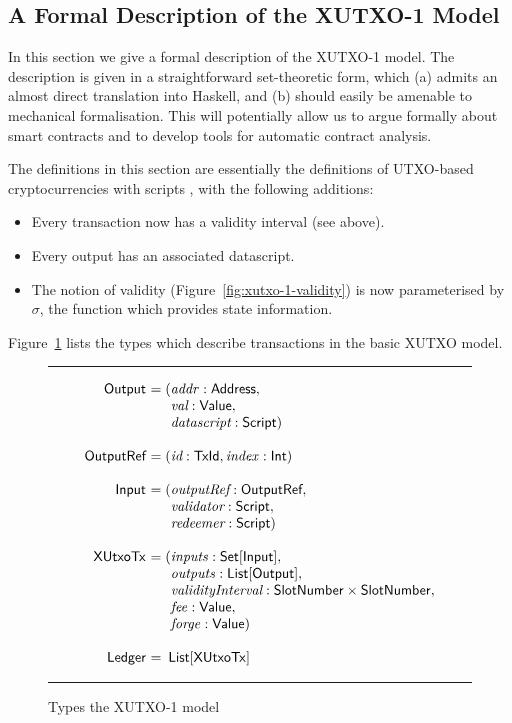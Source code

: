 \documentclass[a4paper]{article}
\renewcommand{\i}{\textit}  %
\newcommand{\s}{\textsf}  %
\theoremstyle{definition}  %
\newenvironment{arraydefs}[1]{\setlength{\arraycolsep}{0pt}\begin{array}{#1}}{\end{array}}
\newcommand\rfskip{7pt}
\newenvironment{ruledfigure}[1]{\begin{figure}[#1]\hrule\vspace{\rfskip}}{\vspace{\rfskip}\hrule\end{figure}}
\newcommand{\List}[1]{\ensuremath{\s{List}[#1]}}
\newcommand{\Set}[1]{\ensuremath{\s{Set}[#1]}}
\newcommand{\mi}[1]{\ensuremath{\mathit{#1}}}
\newcommand{\idx}{\mi{index}}
\newcommand{\inputs}{\mi{inputs}}
\newcommand{\outputs}{\mi{outputs}}
\newcommand{\forge}{\mi{forge}}
\newcommand{\fee}{\mi{fee}}
\newcommand{\addr}{\mi{addr}}
\newcommand{\msf}[1]{\ensuremath{\mathsf{#1}}}
\newcommand{\slotnum}{\msf{SlotNumber}}
\newcommand{\xutxotx}{\msf{XUtxoTx}}
\newcommand{\valuetype}{\ensuremath{\s{Value}}}
\begin{document}
\subsection{A Formal Description of the XUTXO-1 Model}
\label{section:xutxo-spec}

In this section we give a formal description of the XUTXO-1 model.  The
description is given in a straightforward set-theoretic form, which
(a) admits an almost direct translation into Haskell, and (b) should
easily be amenable to mechanical formalisation.  This will potentially
allow us to argue formally about smart contracts and to develop tools
for automatic contract analysis.

The definitions in this section are essentially the definitions of
UTXO-based cryptocurrencies with scripts \cite{Zahnentferner18-UTxO},
with the following additions:
\begin{itemize}
\item Every transaction now has a validity interval (see above).
\item Every output has an associated datascript.
\item The notion of validity (Figure~\ref{fig:xutxo-1-validity}) is now
  parameterised by $\sigma$, the function which provides state
  information.
\end{itemize}

\noindent Figure~\ref{fig:xutxo-1-types} lists the types which
describe transactions in the basic XUTXO model.


\begin{ruledfigure}{H}
  \[
  \begin{arraydefs}{rll}
    
    \s{Output } &= (&\addr: \s{Address},\\
    && \i{val}: \valuetype,\\
    &&  \i{datascript}: \s{Script})\\
    \\
    \s{OutputRef } &= (&\i{id}: \s{TxId}, \idx: \s{Int})\\
    \\
    \s{Input } & = (&\i{outputRef}: \s{OutputRef},\\
                 && \i{validator}: \s{Script},\\
                 && \i{redeemer}: \s{Script})\\
     \\
     \xutxotx\s{ } &= (&\inputs: \Set{\s{Input}},\\
     &&\outputs: \List{\s{Output}},\\
     &&\i{validityInterval}: \slotnum \times \slotnum,\\
     && \fee: \valuetype,\\
     &&\forge: \valuetype) \\
     \\
     \s{Ledger } &=&\!\List{\xutxotx}\\
  \end{arraydefs}
  \]
  \caption{Types the XUTXO-1 model}
  \label{fig:xutxo-1-types}
\end{ruledfigure}
\end{document}
